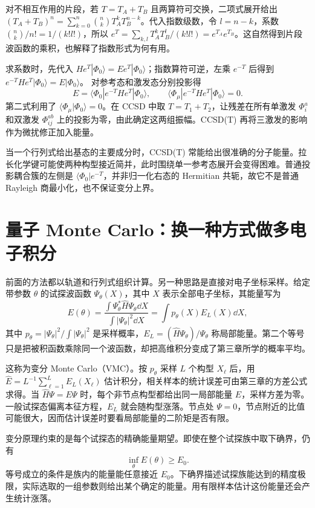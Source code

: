 对不相互作用的片段，若 $T=T_A+T_B$ 且两算符可交换，二项式展开给出 $(T_A+T_B)^n=\sum_{k=0}^n\binom nkT_A^kT_B^{n-k}$。代入指数级数，令 $l=n-k$，系数 $\binom nk/n!=1/(k!l!)$，所以 $e^T=\sum_{k,l}T_A^kT_B^l/(k!l!)=e^{T_A}e^{T_B}$。这自然得到片段波函数的乘积，也解释了指数形式为何有用。

求系数时，先代入 $He^T|\Phi_0\rangle=Ee^T|\Phi_0\rangle$；指数算符可逆，左乘 $e^{-T}$ 后得到
$e^{-T}He^T|\Phi_0\rangle=E|\Phi_0\rangle$。
对参考态和激发态分别投影得
\begin{equation}
E=\langle\Phi_0|e^{-T}He^T|\Phi_0\rangle,\qquad
\langle\Phi_\mu|e^{-T}He^T|\Phi_0\rangle=0.
\end{equation}
第二式利用了 $\langle\Phi_\mu|\Phi_0\rangle=0$。在 CCSD 中取 $T=T_1+T_2$，让残差在所有单激发 $\Phi_i^a$ 和双激发 $\Phi_{ij}^{ab}$ 上的投影为零，由此确定这两组振幅。CCSD(T) 再将三激发的影响作为微扰修正加入能量。

当一个行列式给出基态的主要成分时，CCSD(T) 常能给出很准确的分子能量。拉长化学键可能使两种构型接近简并，此时围绕单一参考态展开会变得困难。普通投影耦合簇的左侧是 $\langle\Phi_0|e^{-T}$，并非归一化右态的 Hermitian 共轭，故它不是普通 Rayleigh 商最小化，也不保证变分上界。

\section{量子 Monte Carlo：换一种方式做多电子积分}
前面的方法都以轨道和行列式组织计算。另一种思路是直接对电子坐标采样。给定带参数 $\theta$ 的试探波函数 $\Psi_\theta(X)$，其中 $X$ 表示全部电子坐标，其能量写为
\begin{equation}
E(\theta)=\frac{\int\Psi_\theta^*\hat H\Psi_\theta\dd X}{\int|\Psi_\theta|^2\dd X}
=\int p_\theta(X)E_L(X)\dd X,
\end{equation}
其中 $p_\theta=|\Psi_\theta|^2/\int|\Psi_\theta|^2$ 是采样概率，$E_L=(\hat H\Psi_\theta)/\Psi_\theta$ 称局部能量。第二个等号只是把被积函数乘除同一个波函数，却把高维积分变成了第三章所学的概率平均。

这称为变分 Monte Carlo（VMC）。按 $p_\theta$ 采样 $L$ 个构型 $X_\ell$ 后，用
$\widehat E=L^{-1}\sum_{\ell=1}^L E_L(X_\ell)$ 估计积分，相关样本的统计误差可由第三章的方差公式求得。当 $\hat H\Psi=E\Psi$ 时，每个非节点构型都给出同一局部能量 $E$，采样方差为零。一般试探态偏离本征方程，$E_L$ 就会随构型涨落。节点处 $\Psi=0$，节点附近的比值可能很大，因而估计误差时要看局部能量的二阶矩是否有限。

变分原理约束的是每个试探态的精确能量期望。即使在整个试探族中取下确界，仍有
\begin{equation}
\inf_\theta E(\theta)\ge E_0.
\end{equation}
等号成立的条件是族内的能量能任意接近 $E_0$。下确界描述试探族能达到的精度极限，实际选取的一组参数则给出某个确定的能量。用有限样本估计这份能量还会产生统计涨落。

